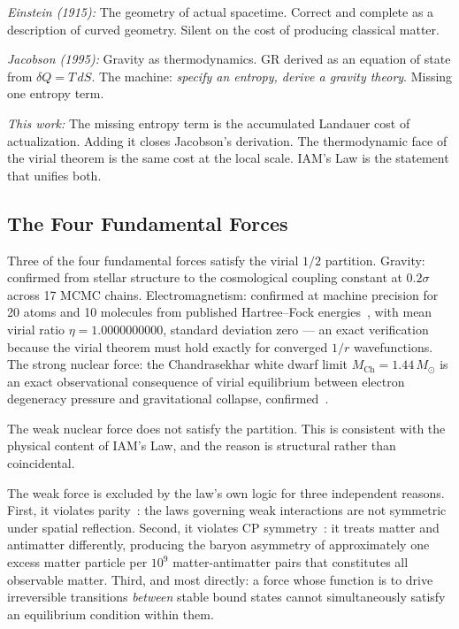 \documentclass[12pt,a4paper]{article}
\begin{document}
\textit{Einstein (1915):} The geometry of actual spacetime. Correct
and complete as a description of curved geometry. Silent on the cost
of producing classical matter.

\textit{Jacobson (1995):} Gravity as thermodynamics. GR derived as
an equation of state from $\delta Q = T\,dS$. The machine:
\textit{specify an entropy, derive a gravity theory}. Missing one
entropy term.

\textit{This work:} The missing entropy term is the accumulated
Landauer cost of actualization. Adding it closes Jacobson's
derivation. The thermodynamic face of the virial theorem is the same
cost at the local scale. IAM's Law is the statement that unifies both.

\subsection{The Four Fundamental Forces}

Three of the four fundamental forces satisfy the virial $1/2$
partition. Gravity: confirmed from stellar structure to the
cosmological coupling constant at $0.2\sigma$ across 17 MCMC chains.
Electromagnetism: confirmed at machine precision for 20 atoms and 10
molecules from published Hartree--Fock energies~\citep{Clementi1974},
with mean virial ratio $\eta = 1.0000000000$, standard deviation zero
--- an exact verification because the virial theorem must hold exactly
for converged $1/r$ wavefunctions. The strong nuclear force: the
Chandrasekhar white dwarf limit $M_\mathrm{Ch} = 1.44\,M_\odot$ is
an exact observational consequence of virial equilibrium between
electron degeneracy pressure and gravitational collapse,
confirmed~\citep{Chandrasekhar1931}.

The weak nuclear force does not satisfy the partition. This is
consistent with the physical content of IAM's Law, and the
reason is structural rather than coincidental.

The weak force is excluded by the law's own logic for three
independent reasons. First, it violates parity~\citep{Wu1957}:
the laws governing weak interactions are not symmetric under
spatial reflection. Second, it violates CP symmetry~\citep{Cronin1964}:
it treats matter and antimatter differently, producing the baryon
asymmetry of approximately one excess matter particle per $10^9$
matter-antimatter pairs that constitutes all observable matter.
Third, and most directly: a force whose function is to drive
irreversible transitions \textit{between} stable bound states
cannot simultaneously satisfy an equilibrium condition within them.
\end{document}
